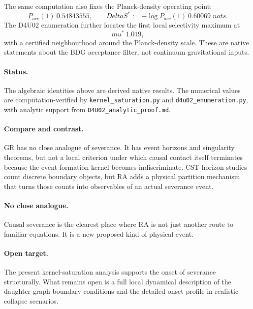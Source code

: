 \documentclass[11pt]{article}
\def\Delta{Delta}%
\def\mu{mu}%
\def\mathrm#1{#1}%
\def\approx{~}%
\begin{document}
The same computation also fixes the Planck-density operating point:
\begin{equation}
P_{\mathrm{acc}}(1)\approx 0.54843555,
\qquad
\Delta S^*:=-\log P_{\mathrm{acc}}(1)\approx0.60069\;\mathrm{nats}.
\end{equation}
The D4U02 enumeration further locates the first local selectivity maximum at
\begin{equation}
\mu^*\approx1.019,
\end{equation}
with a certified neighbourhood around the Planck-density scale. These are native statements about the BDG acceptance filter, not continuum gravitational inputs.

\paragraph{Status.} The algebraic identities above are derived native results. The numerical values are computation-verified by \texttt{kernel\_saturation.py} and \texttt{d4u02\_enumeration.py}, with analytic support from \texttt{D4U02\_analytic\_proof.md}.

\paragraph{Compare and contrast.} GR has no close analogue of severance. It has event horizons and singularity theorems, but not a local criterion under which causal contact itself terminates because the event-formation kernel becomes indiscriminate. CST horizon studies count discrete boundary objects, but RA adds a physical partition mechanism that turns those counts into observables of an actual severance event.

\paragraph{No close analogue.} Causal severance is the clearest place where RA is not just another route to familiar equations. It is a new proposed kind of physical event.

\paragraph{Open target.} The present kernel-saturation analysis supports the onset of severance structurally. What remains open is a full local dynamical description of the daughter-graph boundary conditions and the detailed onset profile in realistic collapse scenarios.
\end{document}
